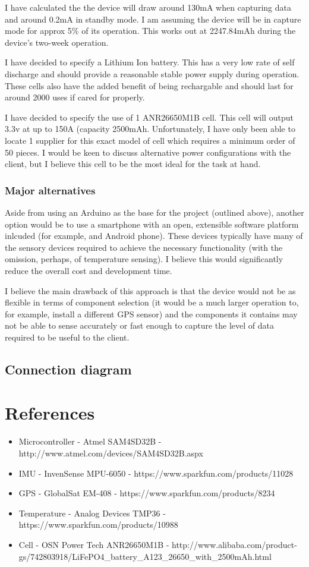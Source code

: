 \documentclass[a4paper, twoside]{article}
\begin{document}
I have calculated the the device will draw around 130mA when capturing data and
around 0.2mA in standby mode. I am assuming the device will be in capture mode
for approx 5\% of its operation. This works out at 2247.84mAh during the
device's two-week operation.

I have decided to specify a Lithium Ion battery. This has a very low rate of
self discharge and should provide a reasonable stable power supply during
operation. These cells also have the added benefit of being rechargable and
should last for around 2000 uses if cared for properly.

I have decided to specify the use of 1 ANR26650M1B cell. This cell will output
3.3v at up to 150A (capacity 2500mAh. Unfortunately, I have only been able to
locate 1 supplier for this exact model of cell which requires a minimum order of
50 pieces. I would be keen to discuss alternative power configurations with the
client, but I believe this cell to be the most ideal for the task at hand.

\subsubsection{Major alternatives}
Aside from using an Arduino as the base for the project (outlined above),
another option would be to use a smartphone with an open, extensible software
platform inlcuded (for example, and Android phone). These devices typically have
many of the sensory devices required to achieve the necessary functionality
(with the omission, perhaps, of temperature sensing). I believe this would
significantly reduce the overall cost and development time.

I believe the main drawback of this approach is that the device would not be as
flexible in terms of component selection (it would be a much larger operation
to, for example, install a different GPS sensor) and the components it contains
may not be able to sense accurately or fast enough to capture the level of data
required to be useful to the client.

\subsection{Connection diagram}

\section{References}
\begin{itemize}
	\item{Microcontroller - Atmel SAM4SD32B - http://www.atmel.com/devices/SAM4SD32B.aspx}
	\item{IMU - InvenSense MPU-6050 - https://www.sparkfun.com/products/11028}
	\item{GPS - GlobalSat EM-408 - https://www.sparkfun.com/products/8234}
	\item{Temperature - Analog Devices TMP36 - https://www.sparkfun.com/products/10988}
	\item{Cell - OSN Power Tech ANR26650M1B -
		http://www.alibaba.com/product-gs/742803918/LiFePO4\_battery\_A123\_26650\_with\_2500mAh.html}
\end{itemize}
\end{document}
